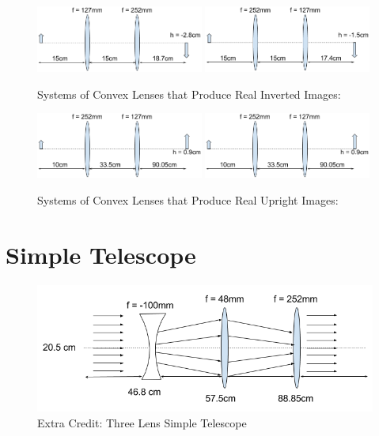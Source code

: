 \documentclass{amsart}
\begin{document}
\begin{figure}[H]
\includegraphics[width=0.49\textwidth]{ConvexLensSystem.png}
\includegraphics[width=0.49\textwidth]{ConvexLensSystem(1).png}
\end{figure}

\begin{figure}[h]
\centering
\caption{Systems of Convex Lenses that Produce Real Inverted Images:}
\end{figure}

\medskip

\begin{figure}[H]
\includegraphics[width=0.49\textwidth]{ConvexLensSystem(2).png}
\includegraphics[width=0.49\textwidth]{ConvexLensSystem(2).png}
\end{figure}

 \begin{figure}[H]
\centering
\caption{Systems of Convex Lenses that Produce Real Upright Images:}
\end{figure}

\medskip

\section{Simple Telescope}
\begin{figure}[h]
\centering
\includegraphics[width = 14cm]{SimpleTelescope.png}
\caption{Extra Credit: Three Lens Simple Telescope}
\end{figure}
\end{document}
